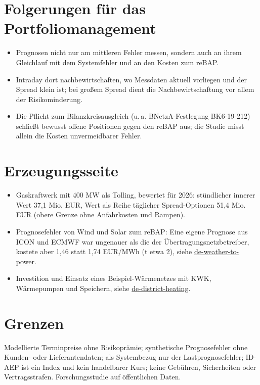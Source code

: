 \documentclass[10pt,a4paper]{article}
\begin{document}
\section{Folgerungen für das Portfoliomanagement}
\begin{itemize}
\item Prognosen nicht nur am mittleren Fehler messen, sondern auch an ihrem Gleichlauf mit dem Systemfehler und an den
Kosten zum reBAP.
\item Intraday dort nachbewirtschaften, wo Messdaten aktuell vorliegen und der Spread klein ist; bei großem Spread
dient die Nachbewirtschaftung vor allem der Risikominderung.
\item Die Pflicht zum Bilanzkreisausgleich (u.\,a. BNetzA-Festlegung BK6-19-212) schließt bewusst offene Positionen
gegen den reBAP aus; die Studie misst allein die Kosten unvermeidbarer Fehler.
\end{itemize}

\section{Erzeugungsseite}
\begin{itemize}
\item Gaskraftwerk mit 400 MW als Tolling, bewertet für 2026: stündlicher innerer Wert 37,1 Mio. EUR, Wert als Reihe
täglicher Spread-Optionen 51,4 Mio. EUR (obere Grenze ohne Anfahrkosten und Rampen).
\item Prognosefehler von Wind und Solar zum reBAP: Eine eigene Prognose aus ICON und ECMWF war ungenauer als die der
Übertragungsnetzbetreiber, kostete aber 1,46 statt 1,74 EUR/MWh (t etwa 2), siehe
\href{https://github.com/serikov-power-markets/de-weather-to-power}{de-weather-to-power}.
\item Investition und Einsatz eines Beispiel-Wärmenetzes mit KWK, Wärmepumpen und Speichern, siehe
\href{https://github.com/serikov-energy-systems/de-district-heating}{de-district-heating}.
\end{itemize}

\section{Grenzen}
Modellierte Terminpreise ohne Risikoprämie; synthetische Prognosefehler ohne Kunden- oder Lieferantendaten; als
Systembezug nur der Lastprognosefehler; ID-AEP ist ein Index und kein handelbarer Kurs; keine Gebühren, Sicherheiten
oder Vertragsstrafen. Forschungsstudie auf öffentlichen Daten.
\end{document}
